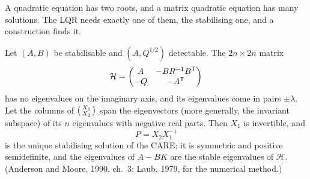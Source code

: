 A quadratic equation has two roots, and a matrix quadratic equation has many solutions. The LQR needs exactly one of them, the stabilising one, and a construction finds it.

\begin{theorem}
\label{thm:I-hamilton}
Let $(A, B)$ be stabilisable and $(A, Q^{1/2})$ detectable. The $2n \times 2n$ matrix
\begin{equation}\label{eq:I-ham}
  \mathcal H = \begin{pmatrix}A & -BR^{-1}B^{\mathsf{T}}\\ -Q & -A^{\mathsf{T}}\end{pmatrix}
\end{equation}
has no eigenvalues on the imaginary axis, and its eigenvalues come in pairs $\pm\lambda$. Let the columns of $\begin{psmallmatrix}X_1\\ X_2\end{psmallmatrix}$ span the eigenvectors (more generally, the invariant subspace) of its $n$ eigenvalues with negative real parts. Then $X_1$ is invertible, and
\begin{equation}\label{eq:I-PX}
  P = X_2X_1^{-1}
\end{equation}
is the unique stabilising solution of the CARE; it is symmetric and positive semidefinite, and the eigenvalues of $A - BK$ are the stable eigenvalues of $\mathcal H$. (Anderson and Moore, 1990, ch.~3; Laub, 1979, for the numerical method.)
\end{theorem}
